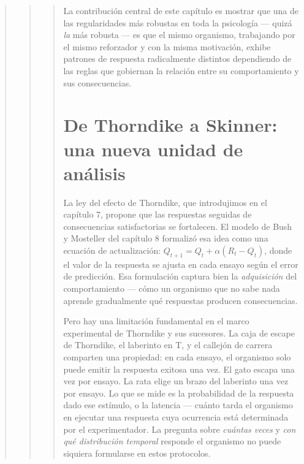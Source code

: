 \documentclass[
  letterpaper,
  DIV=11,
  numbers=noendperiod]{scrreprt}
\begin{document}
\begin{tcolorbox}[enhanced jigsaw, toprule=.15mm, arc=.35mm, colback=white, opacityback=0, colframe=quarto-callout-note-color-frame, breakable, rightrule=.15mm, left=2mm, leftrule=.75mm, bottomrule=.15mm]
\begin{quote}
\begin{quote}
\begin{quote}
La contribución central de este capítulo es mostrar que una de las
regularidades más robustas en toda la psicología --- quizá \emph{la} más
robusta --- es que el mismo organismo, trabajando por el mismo
reforzador y con la misma motivación, exhibe patrones de respuesta
radicalmente distintos dependiendo de las reglas que gobiernan la
relación entre su comportamiento y sus consecuencias.

\section{De Thorndike a Skinner: una nueva unidad de
análisis}\label{de-thorndike-a-skinner-una-nueva-unidad-de-anuxe1lisis}

La ley del efecto de Thorndike, que introdujimos en el capítulo 7,
propone que las respuestas seguidas de consecuencias satisfactorias se
fortalecen. El modelo de Bush y Mosteller del capítulo 8 formalizó esa
idea como una ecuación de actualización:
\(Q_{t+1} = Q_t + \alpha(R_t - Q_t)\), donde el valor de la respuesta se
ajusta en cada ensayo según el error de predicción. Esa formulación
captura bien la \emph{adquisición} del comportamiento --- cómo un
organismo que no sabe nada aprende gradualmente qué respuestas producen
consecuencias.

Pero hay una limitación fundamental en el marco experimental de
Thorndike y sus sucesores. La caja de escape de Thorndike, el laberinto
en T, y el callejón de carrera comparten una propiedad: en cada ensayo,
el organismo solo puede emitir la respuesta exitosa una vez. El gato
escapa una vez por ensayo. La rata elige un brazo del laberinto una vez
por ensayo. Lo que se mide es la probabilidad de la respuesta dado ese
estímulo, o la latencia --- cuánto tarda el organismo en ejecutar una
respuesta cuya ocurrencia está determinada por el experimentador. La
pregunta sobre \emph{cuántas veces} y \emph{con qué distribución
temporal} responde el organismo no puede siquiera formularse en estos
protocolos.


\end{quote}
\end{quote}
\end{quote}
\end{tcolorbox}
\end{document}
